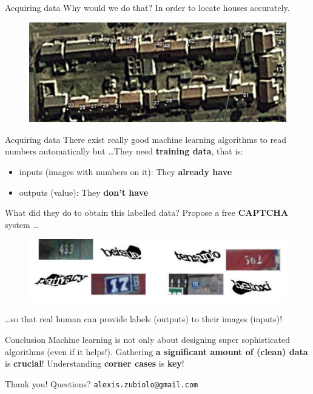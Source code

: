 \documentclass{beamer}
\begin{document}
\begin{frame}{Acquiring data}
Why would we do that? \pause In order to locate houses accurately.
\vfill
\pause
\begin{figure}
\centering
\includegraphics[width=\textwidth]{images/house_numbers.png}
\end{figure}
\end{frame}

\begin{frame}{Acquiring data}
There exist really good machine learning algorithms to read numbers automatically but \ldots \pause They need \textbf{training data}, that is:
\begin{itemize}
	\item inputs (images with numbers on it): They \textbf{already have} \pause
	\item outputs (value): They \textbf{don't have}
\end{itemize}
\vfill
\pause
What did they do to obtain this labelled data? \pause Propose a free \textbf{CAPTCHA} system \ldots
\vfill
\pause
\begin{figure}
\centering
\includegraphics[width=\textwidth]{images/captchas.png}
\end{figure}
\vfill
\pause
\ldots so that real human can provide labels (outputs) to their images (inputs)!
\end{frame}

\begin{frame}{Conclusion}
Machine learning is not only about designing super sophisticated algorithms (even if it helps!).
\vfill
\pause
Gathering \textbf{a significant amount of (clean) data} is \textbf{crucial}!
\vfill
\pause
Understanding \textbf{corner cases} is \textbf{key}!
\end{frame}

\begin{frame}
\vfill
\centering
\begin{huge}
\huge{Thank you! Questions?}
\vfill
\texttt{alexis.zubiolo@gmail.com}
\end{huge}
\vfill
\end{frame}
\end{document}
